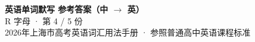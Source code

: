 \documentclass[10pt,a4paper]{article}
\begin{document}
\pagestyle{plain}

\begin{center}
{\LARGE\bfseries 英语单词默写 \quad 参考答案（中 $\to$ 英）}\\[0.22em]
{\large R 字母 · 第 4 / 5 份}\\[0.18em]
{\small 2026年上海市高考英语词汇用法手册 · 参照普通高中英语课程标准}
\end{center}

\vspace{0.2em}
\noindent{\color{rulegray}\rule{\textwidth}{0.8pt}}

\vspace{0.35em}

\vspace{0.25em}
\renewcommand{\arraystretch}{1.32}
\end{document}
